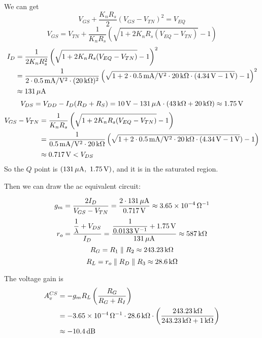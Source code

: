 \documentclass{article}
\newcommand{\unit}[1]{{\rm\,#1}}
\begin{document}
We can get $$V_{GS}+\frac{K_nR_s}{2}(V_{GS}-V_{TN})^2=V_{EQ}$$
$$V_{GS}=V_{TN}+\frac{1}{K_nR_s}\left(\sqrt{1+2K_nR_s(V_{EQ}-V_{TN})}-1\right)$$
\begin{align*}
I_D&=\frac{1}{2K_nR_s^2}\left(\sqrt{1+2K_nR_s(V_{EQ}-V_{TN})}-1\right)^2\\
&=\frac{1}{2\cdot0.5\unit{mA/V^2}\cdot(20\unit{k\Omega})^2}\left(\sqrt{1+2\cdot0.5\unit{mA/V^2}\cdot20\unit{k\Omega}\cdot(4.34\unit{V}-1\unit{V}})-1\right)^2\\
&\approx131\unit{\mu A}
\end{align*}
$$V_{DS}=V_{DD}-I_D(R_D+R_S)=10\unit{V}-131\unit{\mu A}\cdot(43\unit{k\Omega}+20\unit{k\Omega})\approx1.75\unit{V}$$
\begin{align*}
V_{GS}-V_{TN}&=\frac{1}{K_nR_s}\left(\sqrt{1+2K_nR_s(V_{EQ}-V_{TN})}-1\right)\\
&=\frac{1}{0.5\unit{mA/V^2}\cdot20\unit{k\Omega}}\left(\sqrt{1+2\cdot0.5\unit{mA/V^2}\cdot20\unit{k\Omega}\cdot(4.34\unit{V}-1\unit{V}})-1\right)\\
&\approx0.717\unit{V}<V_{DS}
\end{align*}
So the $Q$ point is $(131\unit{\mu A},\ 1.75\unit{V})$, and it is in the saturated region.

Then we can draw the ac equivalent circuit:
\begin{center}
\end{center}

$$g_m=\frac{2I_D}{V_{GS}-V_{TN}}=\frac{2\cdot131\unit{\mu A}}{0.717\unit{V}}\approx3.65\times10^{-4}\unit{\Omega^{-1}}$$
$$r_o=\frac{\dfrac{1}{\lambda}+V_{DS}}{I_D}=\frac{\dfrac{1}{0.0133\unit{V^{-1}}}+1.75\unit{V}}{131\unit{\mu A}}\approx587\unit{k\Omega}$$
$$R_G=R_1\parallel R_2\approx243.23\unit{k\Omega}$$
$$R_L=r_o\parallel R_D\parallel R_3\approx28.6\unit{k\Omega}$$

The voltage gain is
\begin{align*}
A_v^{CS}&=-g_mR_L\left(\frac{R_G}{R_G+R_I}\right)\\
&=-3.65\times10^{-4}\unit{\Omega^{-1}}\cdot28.6\unit{k\Omega}\cdot\left(\frac{243.23\unit{k\Omega}}{243.23\unit{k\Omega}+1\unit{k\Omega}}\right)\\
&\approx-10.4\unit{dB}
\end{align*}
\end{document}

